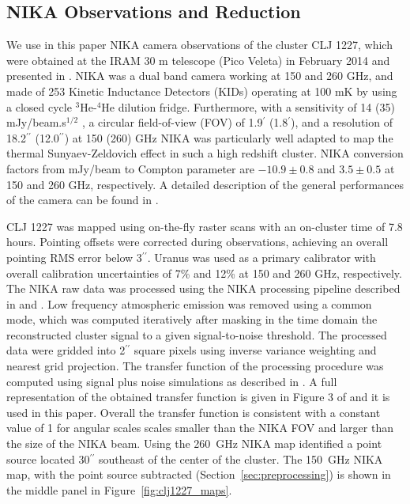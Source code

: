 \documentclass[twocolumn,traditabstract]{aa}
\begin{document}
\subsection{NIKA Observations and Reduction}
\label{sec:nikaobs}
We use in this paper NIKA camera observations of the cluster CLJ 1227, which were obtained at the IRAM 30 m telescope (Pico Veleta) in February 2014 and presented in \citet{adam2015}. NIKA \citep{monfardini2010,monfardini2014} was a dual band camera working at 150 and 260 GHz, and made of 253 Kinetic Inductance Detectors (KIDs) operating at 100 mK by using a closed cycle $^3$He-$^4$He dilution fridge. 
Furthermore, with a sensitivity of 14 (35) mJy/beam.s$^{1/2}$ , a circular field-of-view (FOV) of 1.9$^{\prime}$ (1.8$^{\prime}$), and a resolution of 18.2$^{\prime \prime}$ (12.0$^{\prime \prime}$) at 150 (260) GHz NIKA was particularly well adapted to map the thermal Sunyaev-Zeldovich effect in such a high redshift cluster. NIKA conversion factors from mJy/beam to Compton parameter are $-10.9 \pm 0.8$ and $3.5\pm0.5$ at 150 and 260 GHz, respectively. A detailed description of the general performances of the camera can be found in \citet{catalano2014,adam2014}.

CLJ 1227 was mapped using on-the-fly raster scans
with an on-cluster time of 7.8 hours. Pointing offsets were corrected during observations, achieving an overall pointing RMS
error below 3$^{\prime \prime}$. Uranus was used as a primary calibrator with overall calibration uncertainties of 7\% and 12\% at
150 and 260 GHz, respectively. The NIKA raw data was processed using the NIKA processing pipeline described in \citet{adam2014} and
\citet{adam2015}. Low frequency atmospheric emission was removed using a common mode, which was computed iteratively after masking
in the time domain the reconstructed cluster signal to a given signal-to-noise threshold. 
The processed data were gridded into 2$^{\prime \prime}$ square pixels using inverse variance weighting and nearest grid projection.
The transfer function of the processing procedure was computed using signal plus noise simulations as described in \citet{adam2015}.
A full representation of the obtained transfer function is given in Figure 3 of \citet{adam2015} and it is used in this paper. Overall the transfer function is consistent with a constant value of 1 for angular scales scales smaller than the NIKA FOV and larger than the size of the NIKA beam. Using the 260~GHz NIKA map \citet{adam2015} identified a point source located 30$^{\prime \prime}$ southeast of the center of the cluster. The 150~GHz NIKA map, with the point source subtracted (Section~\ref{sec:preprocessing}) is shown in the middle panel
in Figure~\ref{fig:clj1227_maps}.
\end{document}
